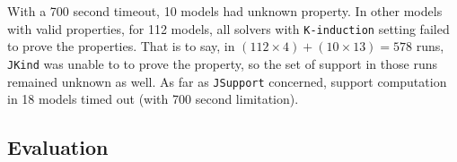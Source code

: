 
With a 700 second timeout, 10 models had unknown property. In other models with valid properties, for 112 models, all solvers with \texttt{K-induction} setting failed to prove the properties. That is to say, in $(112 \times 4) + (10 \times 13) = 578$ runs, \texttt{JKind} was unable to to prove the property, so the set of support in those runs remained unknown as well. As far as \texttt{JSupport} concerned, support computation in 18 models timed out (with 700 second limitation).

\subsection{Evaluation}
\label{subsec:eval}

